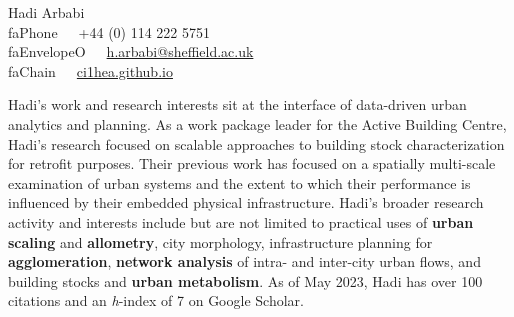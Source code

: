 \documentclass[10pt]{article}
\newcommand{\seticon}[1]{\csname #1\endcsname}
\newcommand{\makeheading}[2][]%
        {\hspace*{-\marginparsep minus \marginparwidth}%
         \begin{minipage}[t]{\textwidth+\marginparwidth+\marginparsep}%
             {\large \bfseries #2 \hfill #1}\\[-0.15\baselineskip]%
                 \rule{\columnwidth}{1pt}%
         \end{minipage}}
\renewcommand{\section}[1]{\pagebreak[3]%
    \vspace{1.3\baselineskip}%
    \phantomsection\addcontentsline{toc}{section}{#1}%
    \noindent\llap{\large\smash{\parbox[t]{\marginparwidth}{\raggedright #1}}}%
    \vspace{-\baselineskip}\par}
\providecommand*\email[1]{\href{mailto:#1}{#1}}
\begin{document}
\vspace*{25mm}
{\Huge Hadi Arbabi}\\[1cm]
\seticon{faPhone}~~~+44 (0) 114 222 5751\\
\seticon{faEnvelopeO}~~~\href{mailto:h.arbabi@sheffield.ac.uk}{h.arbabi@sheffield.ac.uk}\\
\seticon{faChain}~~~\href{https://ci1hea.github.io}{ci1hea.github.io}\\

\section{}
Hadi's work and research interests sit at the interface of data-driven urban analytics and planning. As a work package leader for the Active Building Centre, Hadi's research focused on scalable approaches to building stock characterization for retrofit purposes. Their previous work has focused on a spatially multi-scale examination of urban systems and the extent to which their performance is influenced by their embedded physical infrastructure. Hadi's broader research activity and interests include but are not limited to practical uses of \textbf{urban scaling} and \textbf{allometry}, city morphology, infrastructure planning for \textbf{agglomeration}, \textbf{network analysis} of intra- and inter-city urban flows, and building stocks and \textbf{urban metabolism}. As of May 2023, Hadi has over 100 citations and an \textit{h}-index of 7 on Google Scholar.\par
\end{document}
